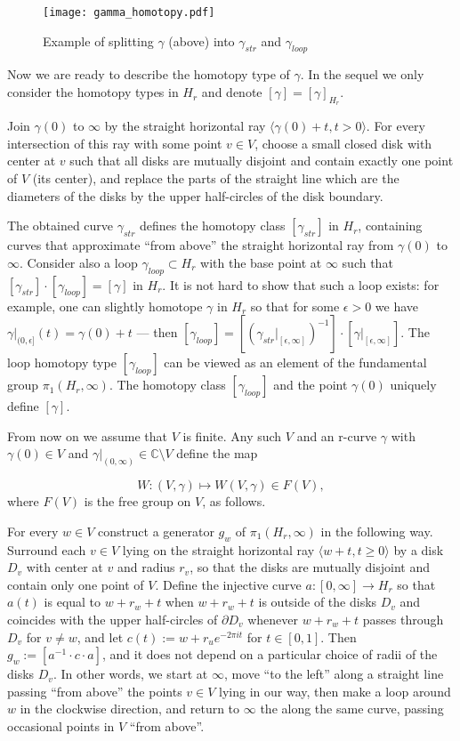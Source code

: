 \documentclass[10pt,reqno,a4paper]{amsart}
\numberwithin{figure}{section}
\numberwithin{equation}{section}
\begin{document}
\begin{figure}[h]
	\texttt{[image: gamma\_homotopy.pdf]}
	\caption{Example of splitting $\gamma$ (above) into $\gamma_{str}$ and $\gamma_{loop}$}
	\label{pic:split}
\end{figure} 

Now we are ready to describe the homotopy type of $\gamma$. In the sequel we only  consider the homotopy types in $H_r$ and denote $[\gamma]=[\gamma]_{H_r}$.

Join $\gamma(0)$ to $\infty$ by the straight horizontal ray $\langle\gamma(0)+t, t>0\rangle$. For every intersection of this ray with some point $v\in V$, choose a small closed disk with center at $v$ such that all disks are mutually disjoint and contain exactly one point of $V$ (its center), and replace the parts of the straight line which are the diameters of the disks by the upper half-circles of the disk boundary. 

The obtained curve $\gamma_{str}$ defines the homotopy class $[\gamma_{str}]$ in $H_r$, containing curves that approximate ``from above'' the straight horizontal ray from $\gamma(0)$ to $\infty$. Consider also a loop $\gamma_{loop}\subset H_r$ with the base point at $\infty$ such that $[\gamma_{str}]\cdot [\gamma_{loop}]=[\gamma]$ in $H_r$. It is not hard to show that such a loop exists: for example, one can slightly homotope $\gamma$ in $H_r$ so that for some $\epsilon>0$ we have $\gamma|_{(0,\epsilon]}(t)=\gamma(0)+t$ --- then $[\gamma_{loop}]=[(\gamma_{str}|_{[\epsilon,\infty]})^{-1}]\cdot[\gamma|_{[\epsilon,\infty]}]$. The loop homotopy type $[\gamma_{loop}]$ can be viewed as an element of the fundamental group $\pi_1(H_r,\infty)$. The homotopy class $[\gamma_{loop}]$ and the point $\gamma(0)$ uniquely define $[\gamma]$.

From now on we assume that $V$ is finite. Any such $V$ and an r-curve $\gamma$ with $\gamma(0)\in V$ and $\gamma|_{(0,\infty)}\in\mathbb{C}\setminus V$ define the map  

$$W: (V,\gamma)\mapsto W(V,\gamma)\in F(V),$$
where $F(V)$ is the free group on $V$, as follows. 

For every $w\in V$ construct a generator $g_w$ of $\pi_1(H_r,\infty)$ in the following way. Surround each $v\in V$ lying on the straight horizontal ray $\langle w+t, t\geq0\rangle$ by a disk $D_v$ with center at $v$ and radius $r_v$, so that the disks are mutually disjoint and contain only one point of $V$. Define the injective curve $a:[0,\infty]\to H_r$ so that $a(t)$ is equal to $w+r_w+t$ when $w+r_w+t$ is outside of the disks $D_v$ and coincides with the upper half-circles of $\partial D_v$ whenever $w+r_w+t$ passes through $D_v$ for $v\neq w$, and let $c(t):=w+r_u e^{-2\pi i t}$ for $t\in [0,1]$. Then $g_w:=[a^{-1}\cdot c\cdot a]$, and it does not depend on a particular choice of radii of the disks $D_v$. In other words, we start at $\infty$, move ``to the left'' along a straight line passing ``from above'' the points $v\in V$ lying in our way, then make a loop around $w$ in the clockwise direction, and return to $\infty$ the along the same curve, passing occasional points in $V$ ``from above''.
\end{document}
